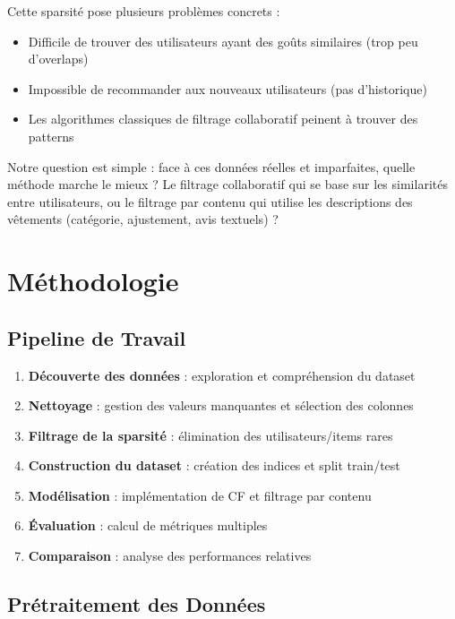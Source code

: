 \documentclass[12pt,a4paper]{article}
\begin{document}
Cette sparsité pose plusieurs problèmes concrets :
\begin{itemize}
    \item Difficile de trouver des utilisateurs ayant des goûts similaires (trop peu d'overlaps)
    \item Impossible de recommander aux nouveaux utilisateurs (pas d'historique)
    \item Les algorithmes classiques de filtrage collaboratif peinent à trouver des patterns
\end{itemize}

Notre question est simple : face à ces données réelles et imparfaites, quelle méthode marche le mieux ? Le filtrage collaboratif qui se base sur les similarités entre utilisateurs, ou le filtrage par contenu qui utilise les descriptions des vêtements (catégorie, ajustement, avis textuels) ?

\section{Méthodologie}

\subsection{Pipeline de Travail}

\begin{enumerate}
    \item \textbf{Découverte des données} : exploration et compréhension du dataset
    \item \textbf{Nettoyage} : gestion des valeurs manquantes et sélection des colonnes
    \item \textbf{Filtrage de la sparsité} : élimination des utilisateurs/items rares
    \item \textbf{Construction du dataset} : création des indices et split train/test
    \item \textbf{Modélisation} : implémentation de CF et filtrage par contenu
    \item \textbf{Évaluation} : calcul de métriques multiples
    \item \textbf{Comparaison} : analyse des performances relatives
\end{enumerate}

\subsection{Prétraitement des Données}
\end{document}
